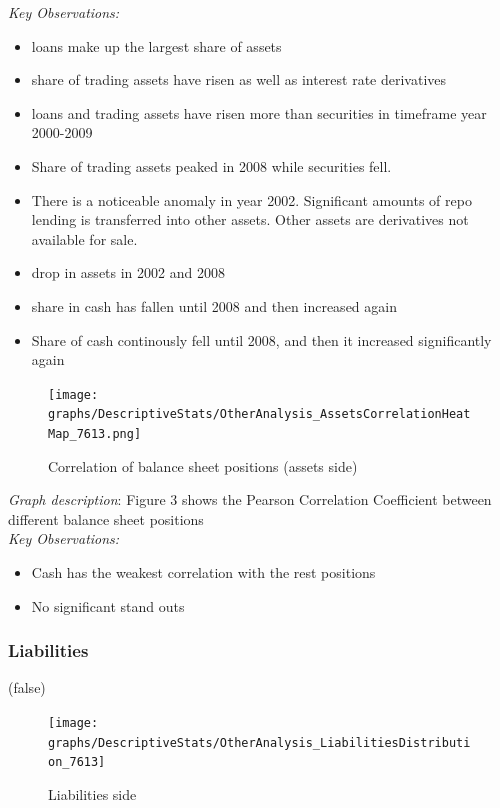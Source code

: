 \documentclass[12pt, a4paper]{article} %
\begin{document}
\noindent \textit{Key Observations:}
\begin{itemize}
\item loans make up the largest share of assets
\item share of trading assets have risen as well as interest rate derivatives
\item loans and trading assets have risen more than securities in timeframe year 2000-2009
\item Share of trading assets peaked in 2008 while securities fell.
\item There is a noticeable anomaly in year 2002. Significant amounts of repo lending is transferred into other assets. Other assets are derivatives not available for sale. 
\item drop in assets in 2002 and 2008
\item share in cash has fallen until 2008 and then increased again
\item Share of cash continously fell until 2008, and then it increased significantly again
\end{itemize}

\newpage

\begin{figure}[hbtp]
\centering
\caption{Correlation of balance sheet positions (assets side)}
\texttt{[image: graphs/DescriptiveStats/OtherAnalysis\_AssetsCorrelationHeatMap\_7613.png]}
\end{figure}

\noindent \textit{Graph description}: Figure 3 shows the Pearson Correlation Coefficient between different balance sheet positions\\

\textit{Key Observations:}
\begin{itemize}
\item Cash has the weakest correlation with the rest positions
\item No significant stand outs
\end{itemize}

\newpage

\subsubsection{Liabilities}

\if(false)
\begin{figure}[hbtp]
\centering
\caption{Liabilities side}
\texttt{[image: graphs/DescriptiveStats/OtherAnalysis\_LiabilitiesDistribution\_7613]}
\end{figure}
\end{document}
